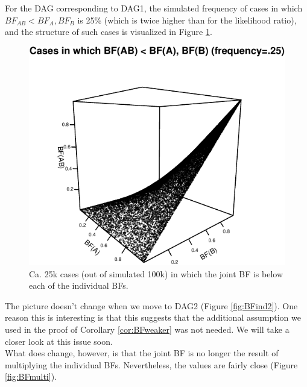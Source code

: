 \documentclass[
  10pt,
  dvipsnames,enabledeprecatedfontcommands]{scrartcl}
\begin{document}
For the DAG corresponding to \textsf{DAG1}, the simulated frequency of
cases in which \(BF_{AB} < BF_{A}, BF_{B}\) is 25\% (which is twice
higher than for the likelihood ratio), and the structure of such cases
is visualized in Figure \ref{fig:BFfails}.

\begin{figure}

\begin{center}\includegraphics[width=1\linewidth]{conjunction-appendix13_files/figure-latex/unnamed-chunk-13-1} \end{center}
\caption{Ca. 25k cases (out of simulated 100k) in which the joint BF is below each of the individual BFs.}
\label{fig:BFfails}
\end{figure}

The picture doesn't change when we move to \textsf{DAG2} (Figure
\ref{fig:BFind2}). One reason this is interesting is that this suggests
that the additional assumption we used in the proof of Corollary
\ref{cor:BFweaker} was not needed. We will take a closer look at this
issue soon.\\
What does change, however, is that the joint BF is no longer the result
of multiplying the individual BFs. Nevertheless, the values are fairly
close (Figure \ref{fig:BFmulti}).

\vspace{1mm}
\footnotesize

\normalsize
\end{document}
